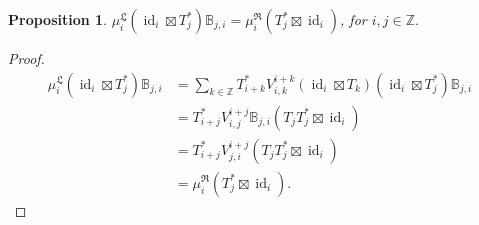 \documentclass{article}
\newtheorem{proposition}{Proposition}
\newcommand{\Z}{\mathbb{Z}}
\begin{document}
\begin{proposition}\label{localbriading}
    $ \mu_i^{\mathfrak{L}}(\operatorname{id}_i\boxtimes T_j^*)\mathbb{B}_{j,i} = \mu_i^{\mathfrak{R}}(T_j^*\boxtimes\operatorname{id}_i)$, for $i,j\in\Z.$
\end{proposition}
\begin{proof}
    \begin{align*}
        \mu_i^{\mathfrak{L}}(\operatorname{id}_i\boxtimes T_j^*)\mathbb{B}_{j,i} &= \sum_{k\in\Z}T_{i+k}^*V_{i,k}^{i+k}(\operatorname{id}_i\boxtimes T_k) (\operatorname{id}_i\boxtimes T_j^*)\mathbb{B}_{j,i}\\
        &=T_{i+j}^*V^{i+j}_{i,j}\mathbb{B}_{j,i}(T_jT_j^*\boxtimes \operatorname{id}_i)  \\ 
        & = T_{i+j}^*V^{i+j}_{j,i}(T_jT_j^*\boxtimes \operatorname{id}_i) \\
        & = \mu_i^{\mathfrak{R}}(T_j^*\boxtimes\operatorname{id}_i).
    \end{align*}
\end{proof}
 
\end{document}
